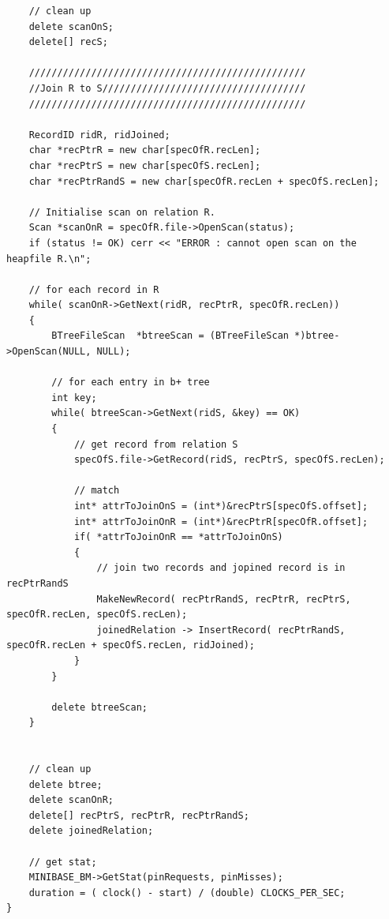 \documentclass{article}
\begin{document}
\begin{lstlisting}
	// clean up
	delete scanOnS;
	delete[] recS;

	/////////////////////////////////////////////////
	//Join R to S////////////////////////////////////
	/////////////////////////////////////////////////

	RecordID ridR, ridJoined;
	char *recPtrR = new char[specOfR.recLen];
	char *recPtrS = new char[specOfS.recLen];
	char *recPtrRandS = new char[specOfR.recLen + specOfS.recLen];

	// Initialise scan on relation R.
	Scan *scanOnR = specOfR.file->OpenScan(status);
	if (status != OK) cerr << "ERROR : cannot open scan on the heapfile R.\n";

	// for each record in R
	while( scanOnR->GetNext(ridR, recPtrR, specOfR.recLen))
	{
		BTreeFileScan  *btreeScan = (BTreeFileScan *)btree->OpenScan(NULL, NULL);
		
		// for each entry in b+ tree
		int key;
		while( btreeScan->GetNext(ridS, &key) == OK)
		{
			// get record from relation S
			specOfS.file->GetRecord(ridS, recPtrS, specOfS.recLen);

			// match
			int* attrToJoinOnS = (int*)&recPtrS[specOfS.offset];
			int* attrToJoinOnR = (int*)&recPtrR[specOfR.offset];
			if( *attrToJoinOnR == *attrToJoinOnS)
			{
				// join two records and jopined record is in recPtrRandS
				MakeNewRecord( recPtrRandS, recPtrR, recPtrS, specOfR.recLen, specOfS.recLen);	
				joinedRelation -> InsertRecord( recPtrRandS, specOfR.recLen + specOfS.recLen, ridJoined);
			}	
		}

		delete btreeScan;
	}


	// clean up
	delete btree;
	delete scanOnR;
	delete[] recPtrS, recPtrR, recPtrRandS;
	delete joinedRelation;

	// get stat;
	MINIBASE_BM->GetStat(pinRequests, pinMisses);
	duration = ( clock() - start) / (double) CLOCKS_PER_SEC;
}
\end{lstlisting}

\newpage
\end{document}
